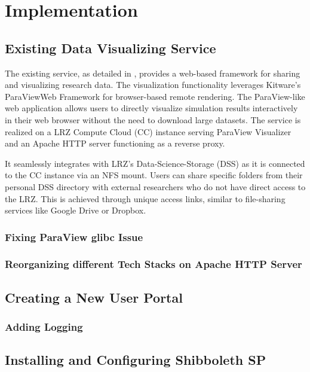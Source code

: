 \chapter{Implementation}\label{chapter:implementation}


\section{Existing Data Visualizing Service}

The existing service, as detailed in \cite{nowak2024pvw}, provides a web-based
framework for sharing and visualizing research data. The visualization
functionality leverages Kitware's ParaViewWeb Framework for browser-based remote
rendering. The ParaView-like web application allows users to directly visualize
simulation results interactively in their web browser without the need to
download large datasets. The service is realized on a LRZ Compute Cloud (CC)
instance serving ParaView Visualizer and an Apache HTTP server functioning as a
reverse proxy.

It seamlessly integrates with LRZ's Data-Science-Storage (DSS) as it is
connected to the CC instance via an NFS mount. Users can share specific folders
from their personal DSS directory with external researchers who do not have
direct access to the LRZ. This is achieved through unique access links, similar
to file-sharing services like Google Drive or Dropbox.

\subsection{Fixing ParaView glibc Issue}

\subsection{Reorganizing different Tech Stacks on Apache HTTP Server}

\section{Creating a New User Portal}

\subsection{Adding Logging}

\section{Installing and Configuring Shibboleth SP}\label{section:shibboleth}

